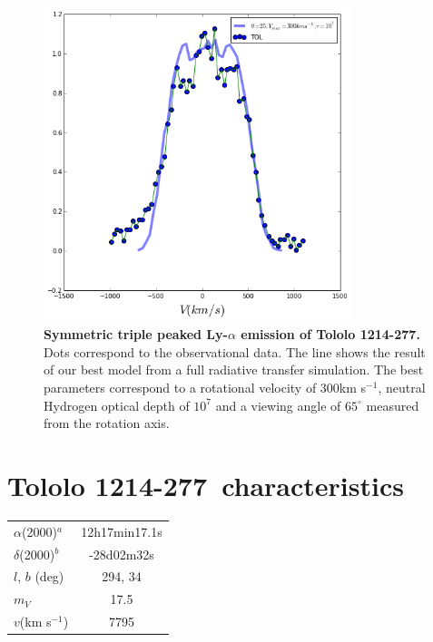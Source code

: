 \documentclass[a4paper, usenatbib, 12pt]{article}
\newcommand{\tol}{Tololo 1214-277}
\begin{document}
{\begin{figure}
\begin{center}
\includegraphics[width=0.8\textwidth]{tolfit.png}
\caption{{\bf Symmetric triple peaked Ly-$\alpha$ emission of \tol.}
  Dots correspond to the observational data. The line shows the result
of our best model from a full radiative transfer simulation. The best
parameters correspond to a rotational velocity of $300$km s$^{-1}$,
neutral Hydrogen optical depth of $10^{7}$ and a viewing angle of
$65^{\circ}$ measured from the rotation axis.} 
\end{center}
\end{figure}

{}


\newpage 

\section*{\tol\ characteristics}


\begin{table}
\begin{center}
\begin{tabular}{lc}
$\alpha$(2000)$^{a}$ & 12h17min17.1s\\
$\delta$(2000)$^{b}$ & -28d02m32s\\
$l$, $b$ (deg) & 294, 34\\
$m_V$ & 17.5\\
$v$(km s$^{-1}$) & 7795
\end{tabular}
\end{center}


\end{table}}
\end{document}
